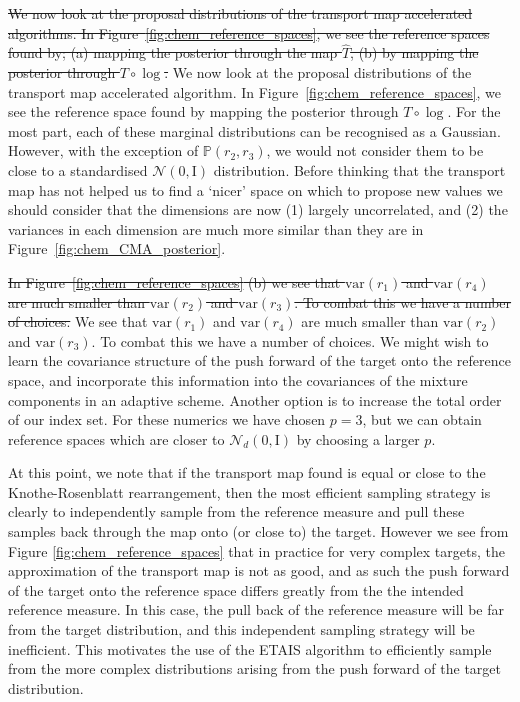 \documentclass[final]{siamltex}
\newcommand{\edit}[1]{{\color{red} #1}}  %
\providecommand{\DIFdel}[1]{{\protect\color{red}\sout{#1}}}                      %
\providecommand{\DIFaddbegin}{} %
\providecommand{\DIFaddend}{} %
\providecommand{\DIFdelbegin}{} %
\providecommand{\DIFdelend}{} %
\newcommand{\DIFscaledelfig}{0.5}
\newlength{\DIFdelgraphicswidth} %
\newlength{\DIFdelgraphicsheight} %
\newcommand{\DIFaddincludegraphics}[2][]{{\color{blue}\fbox{\DIFOincludegraphics[#1]{#2}}}} %
\newcommand{\DIFdelincludegraphics}[2][]{%
\sbox{\DIFdelgraphicsbox}{\DIFOincludegraphics[#1]{#2}}%
\settoboxwidth{\DIFdelgraphicswidth}{\DIFdelgraphicsbox} %
\settoboxtotalheight{\DIFdelgraphicsheight}{\DIFdelgraphicsbox} %
\scalebox{\DIFscaledelfig}{%
\parbox[b]{\DIFdelgraphicswidth}{\usebox{\DIFdelgraphicsbox}\\[-\baselineskip] \rule{\DIFdelgraphicswidth}{0em}}\llap{\resizebox{\DIFdelgraphicswidth}{\DIFdelgraphicsheight}{%
\setlength{\unitlength}{\DIFdelgraphicswidth}%
\begin{picture}(1,1)%
\thicklines\linethickness{2pt} %
{\color[rgb]{1,0,0}\put(0,0){\framebox(1,1){}}}%
{\color[rgb]{1,0,0}\put(0,0){\line( 1,1){1}}}%
{\color[rgb]{1,0,0}\put(0,1){\line(1,-1){1}}}%
\end{picture}%
}\hspace*{3pt}}} %
} %
\DeclareRobustCommand{\DIFaddbegin}{\DIFOaddbegin \let\includegraphics\DIFaddincludegraphics} %
\DeclareRobustCommand{\DIFaddend}{\DIFOaddend \let\includegraphics\DIFOincludegraphics} %
\DeclareRobustCommand{\DIFdelbegin}{\DIFOdelbegin \let\includegraphics\DIFdelincludegraphics} %
\DeclareRobustCommand{\DIFdelend}{\DIFOaddend \let\includegraphics\DIFOincludegraphics} %
\begin{document}
\DIFdelbegin \DIFdel{We now look at the proposal distributions of the transport map accelerated algorithms. In Figure~\ref{fig:chem_reference_spaces}, we see the reference spaces found by; (a) mapping the posterior through the map $\hat{T}$, (b) by mapping the posterior through $T\circ\log$. }\DIFdelend \DIFaddbegin \edit{
We now look at the proposal distributions of the transport map accelerated algorithm. In Figure~\ref{fig:chem_reference_spaces}, we see the reference space found by mapping the posterior through $T\circ\log$.} \DIFaddend For the most part, each of these marginal distributions can be recognised as a Gaussian. However, with the exception of $\mathbb{P}(r_2,r_3)$, we would not consider them to be close to a standardised $\mathcal{N}(0, \text{I})$ distribution. Before thinking that the transport map has not helped us to find a `nicer' space on which to propose new values we should consider that the dimensions are now (1) largely uncorrelated, and (2) the variances in each dimension are much more similar than they are in Figure~\ref{fig:chem_CMA_posterior}.


\DIFdelbegin \DIFdel{In Figure~\ref{fig:chem_reference_spaces} (b) we see that
$\text{var}(r_1)$ and $\text{var}(r_4)$ are much smaller than
$\text{var}(r_2)$ and $\text{var}(r_3)$. To combat this we have a
number of choices. }\DIFdelend \DIFaddbegin \edit{We see that
$\text{var}(r_1)$ and $\text{var}(r_4)$ are much smaller than
$\text{var}(r_2)$ and $\text{var}(r_3)$. To combat this we have a
number of choices.} \DIFaddend We might wish to learn the covariance structure of
the push forward of the target onto the reference space, and
incorporate this information into the covariances of the mixture
components in an adaptive scheme. Another option is to increase the
total order of our index set. For these numerics we have chosen $p=3$,
but we can obtain reference spaces which are closer to
$\mathcal{N}_d(0, \text{I})$ by choosing a larger $p$.

\DIFaddbegin \edit{At this point, we note that if the transport map found is equal
  or close to the Knothe-Rosenblatt rearrangement, then the most
  efficient sampling strategy is clearly to independently sample from the
  reference measure and pull these samples back through the map onto
  (or close to) the target. However we see from Figure
  \ref{fig:chem_reference_spaces} that in practice for very complex
  targets, the approximation of the transport map is not as good, and
  as such the push forward of the target onto the reference
  space differs greatly from the the intended reference measure. In
  this case, the pull back of the reference measure will be far from
  the target distribution, and this independent sampling strategy
  will be inefficient. This motivates the use of the ETAIS algorithm
  to efficiently sample from the more complex distributions arising
  from the push forward of the target distribution. %
  }
\end{document}
